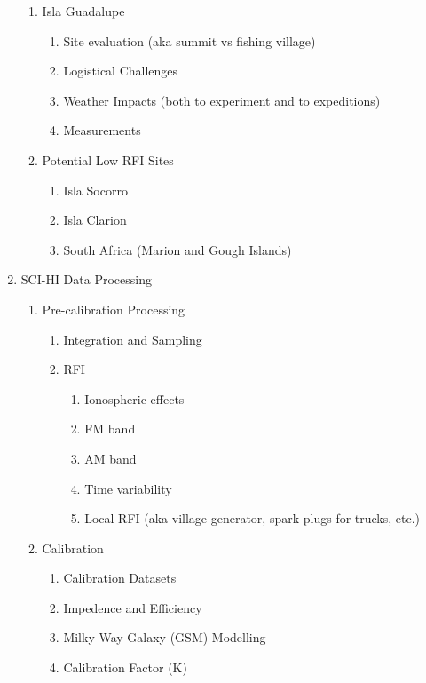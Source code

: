 \documentclass[12pt,twoside]{report}
\begin{document}
\begin{enumerate}
\begin{enumerate}
\item Isla Guadalupe

\begin{enumerate}
\item Site evaluation (aka summit vs fishing village)
\item Logistical Challenges
\item Weather Impacts (both to experiment and to expeditions)
\item Measurements 
\end{enumerate}

\item Potential Low RFI Sites

\begin{enumerate}
\item Isla Socorro
\item Isla Clarion
\item South Africa (Marion and Gough Islands)
\end{enumerate}

\end{enumerate}

\item SCI-HI Data Processing

\begin{enumerate}
\item Pre-calibration Processing

\begin{enumerate}
\item Integration and Sampling
\item RFI

\begin{enumerate}
\item Ionospheric effects
\item FM band
\item AM band
\item Time variability
\item Local RFI (aka village generator, spark plugs for trucks, etc.)
\end{enumerate}
\end{enumerate}

\item Calibration 

\begin{enumerate}
\item Calibration Datasets
\item Impedence and Efficiency
\item Milky Way Galaxy (GSM) Modelling
\item Calibration Factor (K)


\end{enumerate}
\end{enumerate}
\end{enumerate}
\end{document}
